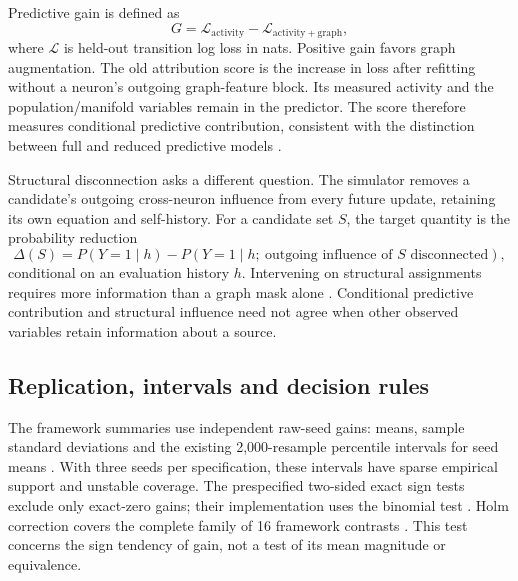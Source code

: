 \documentclass[11pt,a4paper]{article}
\begin{document}
Predictive gain is defined as
\begin{equation}
  G = \mathcal{L}_{\mathrm{activity}}-
      \mathcal{L}_{\mathrm{activity+graph}},
\end{equation}
where $\mathcal{L}$ is held-out transition log loss in nats. Positive gain favors
graph augmentation. The old attribution score is the increase in loss after
refitting without a neuron's outgoing graph-feature block. Its measured activity
and the population/manifold variables remain in the predictor. The score therefore
measures conditional predictive contribution, consistent with the distinction
between full and reduced predictive models \citep{williamson2023importance}.

Structural disconnection asks a different question. The simulator removes a
candidate's outgoing cross-neuron influence from every future update, retaining
its own equation and self-history. For a candidate set $S$, the target quantity is
the probability reduction
\begin{equation}
  \Delta(S)=P(Y=1\mid h)-
  P\!\left(Y=1\mid h;\ \text{outgoing influence of }S\text{ disconnected}\right),
  \label{eq:effect}
\end{equation}
conditional on an evaluation history $h$. Intervening on structural assignments
requires more information than a graph mask alone \citep{pearl2010causalinference}.
Conditional predictive contribution and structural influence need not agree when
other observed variables retain information about a source.

\subsection{Replication, intervals and decision rules}

The framework summaries use independent raw-seed gains: means, sample standard
deviations and the existing 2,000-resample percentile intervals for seed means
\citep{efron1979bootstrap}. With three seeds per specification, these intervals
have sparse empirical support and unstable coverage. The prespecified two-sided
exact sign tests exclude only exact-zero gains; their implementation uses the
binomial test \citep{scipyBinomtest}. Holm correction covers the complete family
of 16 framework contrasts \citep{holm1979sequential}. This test concerns the sign
tendency of gain, not a test of its mean magnitude or equivalence.
\end{document}
